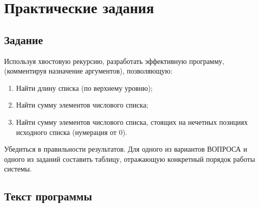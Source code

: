 \chapter{Практические задания}

\section{Задание}

Используя хвостовую рекурсию, разработать эффективную программу, (комментируя
назначение аргументов), позволяющую:

\begin{enumerate}[label=\arabic*)]
    \item Найти длину списка (по верхнему уровню);
    \item Найти сумму элементов числового списка;
    \item Найти сумму элементов числового списка, стоящих на нечетных позициях
        исходного списка (нумерация от 0).
\end{enumerate}

Убедиться в правильности результатов.
Для одного из вариантов ВОПРОСА и одного из заданий составить таблицу,
отражающую конкретный порядок работы системы.

\section{Текст программы}


